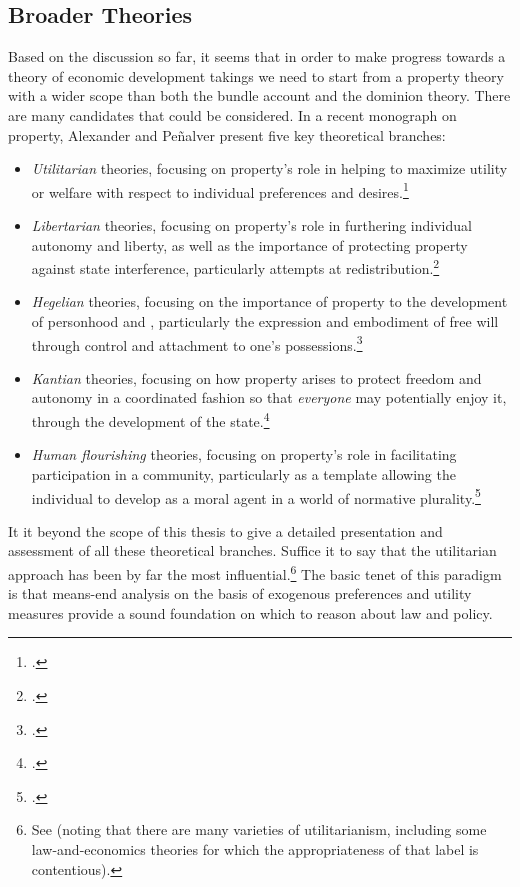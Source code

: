 \subsection{Broader Theories}\label{sec:2:3:2}

Based on the discussion so far, it seems that in order to make progress towards a theory of economic development takings we need to start from a property theory with a wider scope than both the bundle account and the dominion theory. There are many candidates that could be considered. In a recent monograph on property, Alexander and Pe\~{n}alver present five key theoretical branches:
\begin{itemize}
\item {\it Utilitarian} theories, focusing on property's role in helping to maximize utility or welfare with respect to individual preferences and desires.\footnote{\cite[chapter 1]{alexander10}.} 
\item {\it Libertarian} theories, focusing on property's role in furthering individual autonomy and liberty, as well as the importance of protecting property against state interference, particularly attempts at redistribution.\footnote{\cite[chapter 2]{alexander10}.} 
\item {\it Hegelian} theories, focusing on the importance of property to the development of personhood and , particularly the expression and embodiment of free will through control and attachment to one's possessions.\footnote{\cite[chapter 3]{alexander10}.}
\item {\it Kantian} theories, focusing on how property arises to protect freedom and autonomy in a coordinated fashion so that {\it everyone} may potentially enjoy it, through the development of the state.\footnote{\cite[chapter 4]{alexander10}.}
\item {\it  Human flourishing} theories, focusing on property's role in facilitating participation in a community, particularly as a template allowing the individual to develop as a moral agent in a world of normative plurality.\footnote{\cite[chapter 5]{alexander10}.}
\end{itemize}

It it beyond the scope of this thesis to give a detailed presentation and assessment of all these theoretical branches. Suffice it to say that the utilitarian approach has been by far the most influential.\footnote{See \cite[11]{alexander12} (noting that there are many varieties of utilitarianism, including some law-and-economics theories for which the appropriateness of that label is contentious).} The basic tenet of this paradigm is that means-end analysis on the basis of exogenous preferences and utility measures provide a sound foundation on which to reason about law and policy.

